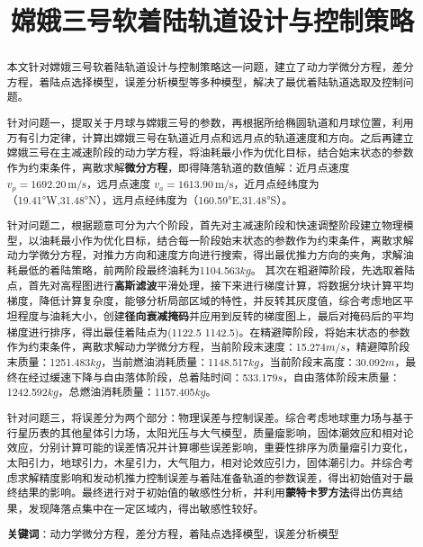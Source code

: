 \documentclass{ctexart}
\title{嫦娥三号软着陆轨道设计与控制策略}
\date{}
\author{}
\begin{document}
\maketitle
\renewcommand{\abstractname}{\Large\textbf{摘要}\\} %
\vspace{-4em} %
\begin{abstract}
\normalsize
本文针对嫦娥三号软着陆轨道设计与控制策略这一问题，建立了动力学微分方程，差分方程，着陆点选择模型，误差分析模型等多种模型，解决了最优着陆轨道选取及控制问题。

针对问题一，提取关于月球与嫦娥三号的参数，再根据所给椭圆轨道和月球位置，利用万有引力定律，计算出嫦娥三号在轨道近月点和远月点的轨道速度和方向。之后再建立嫦娥三号在主减速阶段的动力学方程，将油耗最小作为优化目标，结合始末状态的参数作为约束条件，离散求解\textbf{微分方程}，即得降落轨道的数值解：近月点速度$v_p = 1692.20 \, \text{m/s}$，远月点速度
$v_a = 1613.90 \, \text{m/s}$，近月点经纬度为（19.41°W,31.48°N），远月点经纬度为（160.59°E,31.48°S）。

针对问题二，根据题意可分为六个阶段，首先对主减速阶段和快速调整阶段建立物理模型，以油耗最小作为优化目标，结合每一阶段始末状态的参数作为约束条件，离散求解动力学微分方程，对推力方向和速度方向进行搜索，得出最优推力方向的夹角，求解油耗最低的着陆策略，前两阶段最终油耗为1104.563\(kg\)。
其次在粗避障阶段，先选取着陆点，首先对高程图进行\textbf{高斯滤波}平滑处理，接下来进行梯度计算，将数据分块计算平均梯度，降低计算复杂度，能够分析局部区域的特性，并反转其灰度值，综合考虑地区平坦程度与油耗大小，创建\textbf{径向衰减掩码}并应用到反转的梯度图上，最后对掩码后的平均梯度进行排序，得出最佳着陆点为(1122.5 1142.5)。在精避障阶段，将始末状态的参数作为约束条件，离散求解动力学微分方程，当前阶段末速度：15.274\(m/s\)，精避障阶段末质量：1251.483\(kg\)，当前燃油消耗质量：1148.517\(kg\)，当前阶段末高度：30.092\(m\)，最终在经过缓速下降与自由落体阶段，总着陆时间：533.179\(s\)，自由落体阶段末质量：1242.592\(kg\)，总燃油消耗质量：1157.405\(kg\)。

针对问题三，将误差分为两个部分：物理误差与控制误差。综合考虑地球重力场与基于行星历表的其他星体引力场，太阳光压与大气模型，质量瘤影响，固体潮效应和相对论效应，分别计算可能的误差情况并计算哪些误差影响，重要性排序为质量瘤引力变化，太阳引力，地球引力，木星引力，大气阻力，相对论效应引力，固体潮引力。并综合考虑求解精度影响和发动机推力控制误差与着陆准备轨道的参数误差，得出初始值对于最终结果的影响。最终进行对于初始值的敏感性分析，并利用\textbf{蒙特卡罗方法}得出仿真结果，发现降落点集中在一定区域内，得出敏感性较好。

\textbf{关键词}：动力学微分方程，差分方程，着陆点选择模型，误差分析模型
\end{abstract}
\newpage
\end{document}
